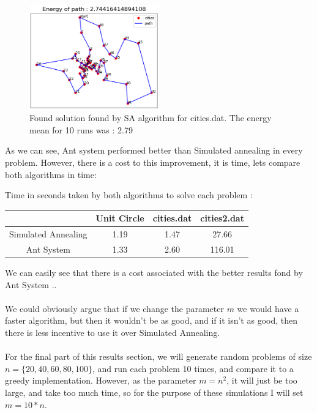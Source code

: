 \documentclass[a4paper]{article}
\begin{document}
\begin{figure}[H]
\center
\includegraphics[width=0.5\textwidth]{images/algorithm_as_cities2.PNG}
\caption{Found solution found by SA algorithm for cities.dat. The energy mean for 10 runs was : 2.79}
\end{figure}

As we can see, Ant system performed better than Simulated annealing in every problem. However, there is a cost to this improvement, it is time, lets compare both algorithms in time:\\
\begin{center}
Time in seconds taken by both algorithms to solve each problem :\\
\begin{tabular}{|c|c|c|c|}
\hline
{\color[HTML]{000000} }                    & {\color[HTML]{000000} Unit Circle} & {\color[HTML]{000000} cities.dat} & {\color[HTML]{000000} cities2.dat} \\ \hline
{\color[HTML]{000000} Simulated Annealing} & {\color[HTML]{000000} 1.19}        & {\color[HTML]{000000} 1.47}       & {\color[HTML]{000000} 27.66}       \\ \hline
{\color[HTML]{000000} Ant System}          & {\color[HTML]{000000} 1.33}        & {\color[HTML]{000000} 2.60}       & {\color[HTML]{000000} 116.01}      \\ \hline
\end{tabular}
\end{center}
We can easily see that there is a cost associated with the better results fond by Ant System .. \\\\
We could obviously argue that if we change the parameter $m$ we would have a faster algorithm, but then it wouldn't be as good, and if it isn't as good, then there is less incentive to use it over Simulated Annealing.\\\\
For the final part of this results section, we will generate random problems of size $n = \{20, 40, 60, 80, 100\}$, and run each problem 10 times, and compare it to a greedy implementation. However, as the parameter $m=n^2$, it will just be too large, and take too much time, so for the purpose of these simulations I will set $m=10*n$.
\end{document}
